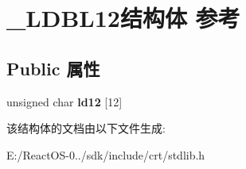 \hypertarget{struct___l_d_b_l12}{}\section{\+\_\+\+L\+D\+B\+L12结构体 参考}
\label{struct___l_d_b_l12}
\subsection*{Public 属性}
\begin{DoxyCompactItemize}
\item 
\mbox{\label{struct___l_d_b_l12_a1fc4c9bfb3eb42e6c69ab7d00aca8ca1}} 
unsigned char {\bfseries ld12} \mbox{[}12\mbox{]}
\end{DoxyCompactItemize}


该结构体的文档由以下文件生成\+:\begin{DoxyCompactItemize}
\item 
E\+:/\+React\+O\+S-\/0../sdk/include/crt/stdlib.\+h\end{DoxyCompactItemize}
